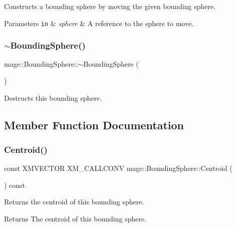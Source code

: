 Constructs a bounding sphere by moving the given bounding sphere.


\begin{DoxyParams}[1]{Parameters}
\mbox{\tt in}  & {\em sphere} & A reference to the sphere to move. \\
\hline
\end{DoxyParams}
\hypertarget{classmage_1_1_bounding_sphere_af8c185ef441e95fd1f833e22fdee2bb3}{}\label{classmage_1_1_bounding_sphere_af8c185ef441e95fd1f833e22fdee2bb3} 
\subsubsection{\texorpdfstring{$\sim$\+Bounding\+Sphere()}{~BoundingSphere()}}
{\footnotesize\ttfamily mage\+::\+Bounding\+Sphere\+::$\sim$\+Bounding\+Sphere (\begin{DoxyParamCaption}{ }\end{DoxyParamCaption})\hspace{0.3cm}{\ttfamily [default]}}

Destructs this bounding sphere. 

\subsection{Member Function Documentation}
\hypertarget{classmage_1_1_bounding_sphere_ae31660bd7333227d3f5e75b3243b8263}{}\label{classmage_1_1_bounding_sphere_ae31660bd7333227d3f5e75b3243b8263} 
\subsubsection{\texorpdfstring{Centroid()}{Centroid()}}
{\footnotesize\ttfamily const X\+M\+V\+E\+C\+T\+OR X\+M\+\_\+\+C\+A\+L\+L\+C\+O\+NV mage\+::\+Bounding\+Sphere\+::\+Centroid (\begin{DoxyParamCaption}{ }\end{DoxyParamCaption}) const\hspace{0.3cm}{\ttfamily [noexcept]}}

Returns the centroid of this bounding sphere.

\begin{DoxyReturn}{Returns}
The centroid of this bounding sphere. 
\end{DoxyReturn}
\hypertarget{classmage_1_1_bounding_sphere_a7a6e27ec28a95caaef46f633b21af54e}{}\label{classmage_1_1_bounding_sphere_a7a6e27ec28a95caaef46f633b21af54e} 
